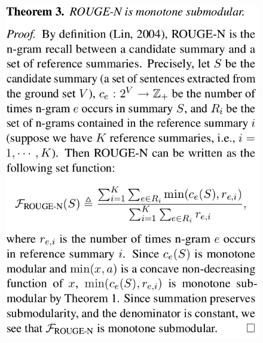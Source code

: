 \documentclass[xcolor={table}]{beamer}
\begin{document}
\begin{frame}[t]{\cite{lin2011class}}
      \begin{figure}[h]
      \includegraphics[scale=.28]{images/rouge-lin11.png} \\
  \end{figure}
\end{frame}
\end{document}

